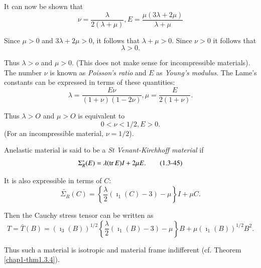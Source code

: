 It can now be shown that 
\begin{equation*}
  \nu = \frac{\lambda}{2(\lambda + \mu )}, E = \frac{\mu(3\lambda +
    2\mu)}{\lambda + \mu}\tag{1.3-41}\label{eq1.3-41} 
\end{equation*}

Since $\mu > 0$ and $3\lambda + 2 \mu > 0$, it follows that $\lambda +
\mu > 0$. Since $\nu > 0$ it follows that  
\begin{equation*}
  \lambda > 0. \tag{1.3-42}\label{eq1.3-42}
\end{equation*}

Thus $\lambda > o$ and $\mu > 0$. (This does not make sense for
incompressible materials). The number $\nu$ is known as
\textit{Poisson's ratio} and $E$ as
\textit{Young's modulus}. The
Lame's constants can be expressed in terms of these quantities:  
\begin{equation*}
\lambda = \frac{E \nu}{(1+\nu ) (1-2\nu )}, \mu =
\frac{E}{2(1+\nu)}. \tag{1.3-43} \label{eq1.3-43}
\end{equation*}

Thus $\lambda > O$ and $\mu > O$ is equivalent to 
\begin{equation*}
0 < \nu < 1/2, E > 0. \tag{1.3-44}\label{eq1.3-44}
\end{equation*}
(For an incompressible material, $\nu = 1/2$). 

An\pageoriginale elastic material is said to be a \textit{St
  Venant-Kirchhoff material} if  
\begin{equation*}
\Sigma_R^*(E) = \lambda (\operatorname{tr} E)I + 2\mu E. \tag{1.3-45}\label{eq1.3-45}
\end{equation*}

It is also expressible in terms of $C$:
\begin{equation*}
  \tilde{\Sigma_R}(C) = \left\{\frac{\lambda}{2}(\imath_1(C) -3) - \mu
  \right\}I  + \mu C. \tag{1.3-46} \label{eq1.3-46}
\end{equation*}

Then the Cauchy stress tensor can be written as 
\begin{equation*}
  T = \bar{T}(B) = (\imath_3(B))^{1/2}\left\{\frac{\lambda}{2} (\imath_1(B)-3)
  -\mu\right\} B+\mu(\imath_1(B))^{1/2} B^2. \tag{1.3-47}\label{eq1.3-47} 
\end{equation*}

Thus such a material is isotropic and material frame indifferent
(cf. Theorem \ref{chap1-thm1.3.4}).  


